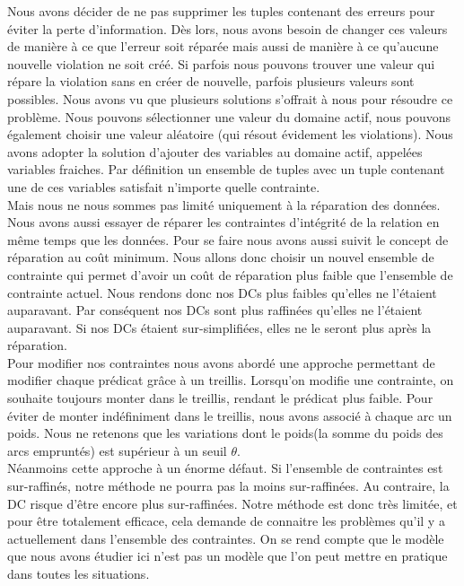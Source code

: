 \documentclass[letterpaper, 12pt]{report}
\theoremstyle{definition}
\begin{document}
Nous avons décider de ne pas supprimer les tuples contenant des erreurs pour éviter la perte d'information. Dès lors, nous avons besoin de changer ces valeurs de manière à ce que l'erreur soit réparée mais aussi de manière à ce qu'aucune nouvelle violation ne soit créé. Si parfois nous pouvons trouver une valeur qui répare la violation sans en créer de nouvelle, parfois plusieurs valeurs sont possibles. Nous avons vu que plusieurs solutions s'offrait à nous pour résoudre ce problème. Nous pouvons sélectionner une valeur du domaine actif, nous pouvons également choisir une valeur aléatoire (qui résout évidement les violations). Nous avons adopter la solution d'ajouter des variables au domaine actif, appelées variables fraiches. Par définition un ensemble de tuples avec un tuple contenant une de ces variables satisfait n'importe quelle contrainte.\\

Mais nous ne nous sommes pas limité uniquement à la réparation des données. Nous avons aussi essayer de réparer les contraintes d'intégrité de la relation en même temps que les données. Pour se faire nous avons aussi suivit le concept de réparation au coût minimum. Nous allons donc choisir un nouvel ensemble de contrainte qui permet d'avoir un coût de réparation plus faible que l'ensemble de contrainte actuel. Nous rendons donc nos DCs plus faibles qu'elles ne l'étaient auparavant. Par conséquent nos DCs sont plus raffinées qu'elles ne l'étaient auparavant. Si nos DCs étaient sur-simplifiées, elles ne le seront plus après la réparation.\\

Pour modifier nos contraintes nous avons abordé une approche permettant de modifier chaque prédicat grâce à un treillis. Lorsqu'on modifie une contrainte, on souhaite toujours monter dans le treillis, rendant le prédicat plus faible. Pour éviter de monter indéfiniment dans le treillis, nous avons associé à chaque arc un poids. Nous ne retenons que les variations dont le poids(la somme du poids des arcs empruntés) est supérieur à un seuil $\theta$.\\

Néanmoins cette approche à un énorme défaut. Si l'ensemble de contraintes est sur-raffinés, notre méthode ne pourra pas la moins sur-raffinées. Au contraire, la DC risque d'être encore plus sur-raffinées. Notre méthode est donc très limitée, et pour être totalement efficace, cela demande de connaitre les problèmes qu'il y a actuellement dans l'ensemble des contraintes. On se rend compte que le modèle que nous avons étudier ici n'est pas un modèle que l'on peut mettre en pratique dans toutes les situations.\\
\end{document}
